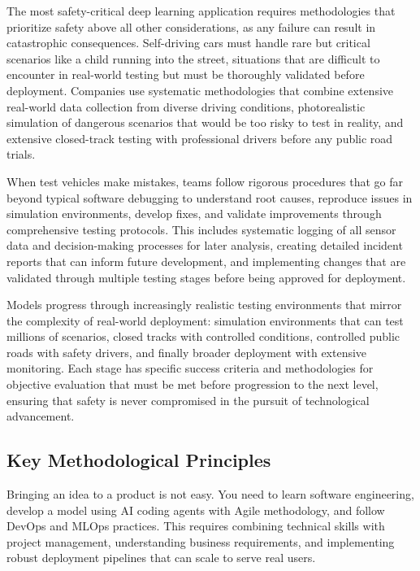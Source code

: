 The most safety-critical deep learning application requires methodologies that prioritize safety above all other considerations, as any failure can result in catastrophic consequences. Self-driving cars must handle rare but critical scenarios like a child running into the street, situations that are difficult to encounter in real-world testing but must be thoroughly validated before deployment. Companies use systematic methodologies that combine extensive real-world data collection from diverse driving conditions, photorealistic simulation of dangerous scenarios that would be too risky to test in reality, and extensive closed-track testing with professional drivers before any public road trials.

When test vehicles make mistakes, teams follow rigorous procedures that go far beyond typical software debugging to understand root causes, reproduce issues in simulation environments, develop fixes, and validate improvements through comprehensive testing protocols. This includes systematic logging of all sensor data and decision-making processes for later analysis, creating detailed incident reports that can inform future development, and implementing changes that are validated through multiple testing stages before being approved for deployment.

Models progress through increasingly realistic testing environments that mirror the complexity of real-world deployment: simulation environments that can test millions of scenarios, closed tracks with controlled conditions, controlled public roads with safety drivers, and finally broader deployment with extensive monitoring. Each stage has specific success criteria and methodologies for objective evaluation that must be met before progression to the next level, ensuring that safety is never compromised in the pursuit of technological advancement.

\subsection{Key Methodological Principles}

\begin{remark}
Bringing an idea to a product is not easy. You need to learn software engineering, develop a model using AI coding agents with Agile methodology, and follow DevOps and MLOps practices. This requires combining technical skills with project management, understanding business requirements, and implementing robust deployment pipelines that can scale to serve real users.
\end{remark}

